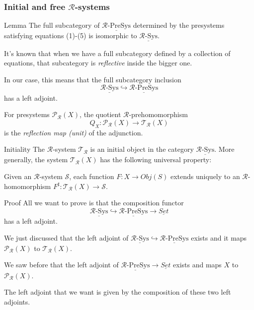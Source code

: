 \documentclass{beamer}
\begin{document}
\begin{frame}
    \small 
    \frametitle{Initial and free $\mathcal{R}$-systems}
    \begin{block}{Lemma}
        The full subcategory of $\underline{\mathcal{R}\text{-PreSys}}$ determined  
        by the presystems satisfying equations (1)-(5) is isomorphic to $\underline{\mathcal{R}\text{-Sys}}$.
    \end{block}

    \bigskip
    It's known that when we have a full subcategory defined by a collection of equations, that subcategory  is 
    \emph{reflective} inside the bigger one. 
    
    In our case, this means that the full subcategory inclusion 
    $$ \underline{\mathcal{R}\text{-Sys}} \hookrightarrow \underline{\mathcal{R}\text{-PreSys}}$$
    has a left adjoint.

    \bigskip
    \pause
    For presystems $\mathcal{P_R}(X)$, the quotient $\mathcal{R}$-prehomomorphism 
    $$Q_X:\mathcal{P_R}(X) \rightarrow \mathcal{T_R}(X)$$
    is the \emph{reflection map (unit)} of the adjunction.

\end{frame}
\begin{frame}
    \scriptsize
    \begin{block}{Initiality}
        The $\mathcal{R}$-system $\mathcal{T_R}$ is an initial object in the category 
        $\underline{\mathcal{R}\text{-Sys}}$. More generally, the system $\mathcal{T_R}(X)$ has the following universal property:

        \medskip
        Given an $\mathcal{R}$-system $\mathcal{S}$, each function $F:X \rightarrow Obj(S)$ extends uniquely 
        to an $\mathcal{R}$-homomorphism $F^\sharp: \mathcal{T_R}(X) \rightarrow \mathcal{S}$.
    \end{block}
    \pause
    \begin{block}{Proof}
        All we want to prove is that the composition functor 
        $$ \underline{\mathcal{R}\text{-Sys}} \hookrightarrow \underline{\mathcal{R}\text{-PreSys}} \rightarrow \underline{Set}$$
        has a left adjoint. 

        \pause
        We just discussed that the left adjoint of $ \underline{\mathcal{R}\text{-Sys}} \hookrightarrow \underline{\mathcal{R}\text{-PreSys}}$ exists and it maps 
        $\mathcal{P_R}(X)$ to $\mathcal{T_R}(X)$.
        
        \pause
        We saw before that the left adjoint of $\underline{\mathcal{R}\text{-PreSys}} \rightarrow \underline{Set}$ exists and maps $X$ to $\mathcal{P_R}(X)$.
        
        \pause
        The left adjoint that we want is given by the composition of these two left adjoints.
    \end{block}
\end{frame}
\end{document}

